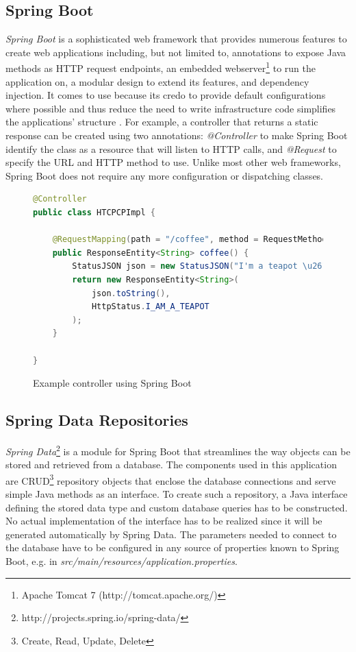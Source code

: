 \subsection{Spring Boot}
\textit{Spring Boot} is a sophisticated web framework that provides numerous features to create web applications including, but not limited to, annotations to expose Java methods as HTTP request endpoints, an embedded webserver\footnote{Apache Tomcat 7 (http://tomcat.apache.org/)} to run the application on, a modular design to extend its features, and dependency injection. It comes to use because its credo to provide default configurations where possible and thus reduce the need to write infrastructure code simplifies the applications' structure \cite[p. 6]{SpringGuide}.
For example, a controller that returns a static response can be created using two annotations:
\textit{@Controller} to make Spring Boot identify the class as a resource that will listen to HTTP calls, and \textit{@Request} to specify the URL and HTTP method to use. Unlike most other web frameworks, Spring Boot does not require any more configuration or dispatching classes.

\begin{figure}[h]
\begin{lstlisting}[language=Java]
@Controller
public class HTCPCPImpl {

	@RequestMapping(path = "/coffee", method = RequestMethod.GET)
	public ResponseEntity<String> coffee() {
		StatusJSON json = new StatusJSON("I'm a teapot \u2615");
		return new ResponseEntity<String>(
			json.toString(),
			HttpStatus.I_AM_A_TEAPOT
		);
	}

}
\end{lstlisting}
\caption[Code: Example Controller]{Example controller using Spring Boot}
\end{figure}

\newpage


\subsection{Spring Data Repositories}
\textit{Spring Data}\footnote{http://projects.spring.io/spring-data/} is a module for Spring Boot that streamlines the way objects can be stored and retrieved from a database. The components used in this application are CRUD\footnote{Create, Read, Update, Delete} repository objects that enclose the database connections and serve simple Java methods as an interface. To create such a repository, a Java interface defining the stored data type and custom database queries has to be constructed.
No actual implementation of the interface has to be realized since it will be generated automatically by Spring Data.
The parameters needed to connect to the database have to be configured in any source of properties known to Spring Boot, e.g. in \textit{src/main/resources/application.properties}.

